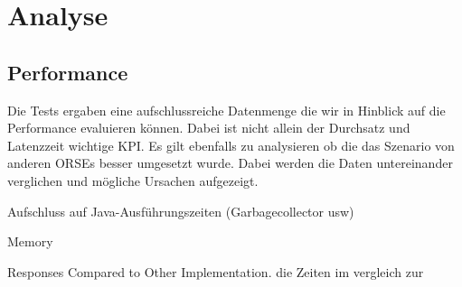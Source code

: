 \documentclass[main.tex]{subfiles}
\begin{document}
\chapter{Analyse} 

\section{Performance}
Die Tests ergaben eine aufschlussreiche Datenmenge die wir in Hinblick auf die Performance evaluieren können. Dabei ist nicht allein der Durchsatz und Latenzzeit wichtige KPI. Es gilt ebenfalls zu analysieren ob die das Szenario von anderen ORSEs besser umgesetzt wurde. Dabei werden die Daten untereinander verglichen und mögliche Ursachen aufgezeigt. 



Aufschluss auf Java-Ausführungszeiten (Garbagecollector usw)

Memory 

Responses Compared to Other Implementation.
die Zeiten im vergleich zur 


\end{document}
